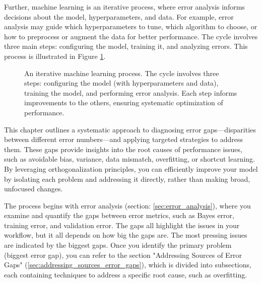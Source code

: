 \documentclass[12pt,openany]{book}
\begin{document}
Further, machine learning is an iterative process, where error analysis informs decisions about the model, hyperparameters, and data. For example, error analysis may guide which hyperparameters to tune, which algorithm to choose, or how to preprocess or augment the data for better performance. The cycle involves three main steps: configuring the model, training it, and analyzing errors. This process is illustrated in Figure \ref{fig:ml_cycle}. \newline

\begin{figure}[h!]
\centering
{}
\caption{An iterative machine learning process. The cycle involves three steps: configuring the model (with hyperparameters and data), training the model, and performing error analysis. Each step informs improvements to the others, ensuring systematic optimization of performance.}
\label{fig:ml_cycle}
\end{figure}

This chapter outlines a systematic approach to diagnosing error gaps—disparities between different error numbers—and applying targeted strategies to address them. These gaps provide insights into the root causes of performance issues, such as avoidable bias, variance, data mismatch, overfitting, or shortcut learning. By leveraging orthogonalization principles, you can efficiently improve your model by isolating each problem and addressing it directly, rather than making broad, unfocused changes. \newline

The process begins with error analysis (section: \ref{sec:error_analysis}), where you examine and quantify the gaps between error metrics, such as Bayes error, training error, and validation error. The gaps all highlight the issues in your workflow, but it all depends on how big the gaps are. The most pressing issues are indicated by the biggest gaps. Once you identify the primary problem (biggest error gap), you can refer to the section "Addressing Sources of Error Gaps" (\ref{sec:addressing_sources_error_gaps}), which is divided into subsections, each containing techniques to address a specific root cause, such as overfitting. \newline
\end{document}
